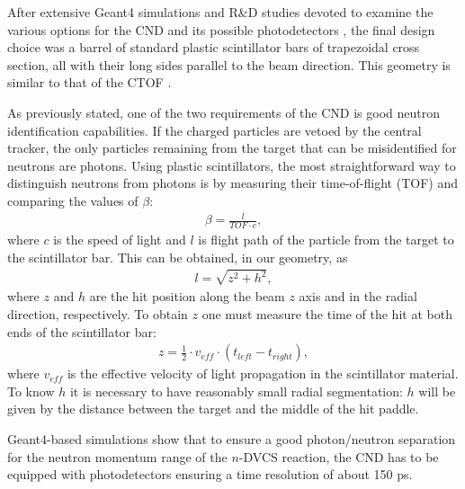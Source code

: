 After extensive Geant4 simulations and R\&D studies devoted to examine the various options for the CND and its possible photodetectors \cite{Niccolai:2018qzm}, the final design choice was a barrel of standard plastic scintillator bars of trapezoidal cross section, all with their long sides parallel to the beam direction. This geometry is similar to that of the CTOF \cite{ctof-nim}. 

As previously stated, one of the two requirements of the CND is good neutron identification capabilities. If the charged particles are vetoed by the central tracker, the only particles remaining from the target that can be misidentified for neutrons are photons. Using plastic scintillators, the most straightforward way to distinguish neutrons from photons is by measuring their time-of-flight (TOF) and comparing the values of $\beta$:
\begin{eqnarray}
\beta= \frac{l}{TOF\cdot c},
\end{eqnarray}
where $c$ is the speed of light and $l$ is flight path of the particle from the target to the scintillator bar. This can be obtained, in our geometry, as
\begin{eqnarray}
l= \sqrt{z^2+h^2},
\end{eqnarray}
where $z$ and $h$ are the hit position along the beam $z$ axis and in the radial direction, respectively. To obtain $z$ one must measure the time of the hit at both ends of the scintillator bar:
\begin{eqnarray}
z=\frac{1}{2} \cdot v_{eff}\cdot(t_{left}-t_{right}),
\end{eqnarray}
where $v_{eff}$ is the effective velocity of light propagation in the scintillator material. To know $h$ it is necessary to have reasonably small radial segmentation: $h$ will be given by the distance between the target and the middle of the hit paddle.
   
Geant4-based simulations show that to ensure a good photon/neutron separation for the neutron momentum range of the $n$-DVCS reaction, the CND has to be equipped with photodetectors ensuring a time resolution of about 150 ps. 


